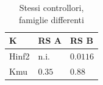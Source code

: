 \begin{table}[htbp]\centering\small
\begin{tabular}{lll}\toprule
K & RS A & RS B\\\midrule
Hinf2 & n.i. & $0.0116$\\
Kmu & $0.35$ & $0.88$\\
\bottomrule\end{tabular}
\caption{Stessi controllori, famiglie differenti}
\end{table}
